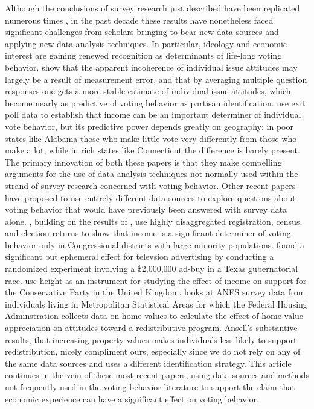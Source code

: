Although the conclusions of survey research just described have been replicated numerous times \parencite{Nie1976,Smith989,LewisBeck2008}, in the past decade these results have nonetheless faced significant challenges from scholars bringing to bear new data sources and applying new data analysis techniques. In particular, ideology and economic interest are gaining renewed recognition as determinants of life-long voting behavior. \textcite{Ansolabehere2008} show that the apparent incoherence of individual issue attitudes may largely be a result of measurement error, and that by averaging multiple question responses one gets a more stable estimate of individual issue attitudes, which become nearly as predictive of voting behavior as partisan identification.  \textcite{Gelman2007} use exit poll data to establish that income can be an important determiner of individual vote behavior, but its predictive power depends greatly on geography: in poor states like Alabama those who make little vote very differently from those who make a lot, while in rich states like Connecticut the difference is barely present. The primary innovation of both these papers is that they make compelling arguments for the use of data analysis techniques not normally used within the strand of survey research concerned with voting behavior.  Other recent papers have proposed to use entirely different data sources to explore questions about voting behavior that would have previously been answered with survey data alone. \textcite{Hersh2015}, building on the results of \textcite{Gelman2007}, use highly disaggregated registration, census, and election returns to show that income is a significant determiner of voting behavior only in Congressional districts with large minority populations. \textcite{Gerber2011} found a significant but ephemeral effect for televsion advertising by conducting a randomized experiment involving a \$2,000,000 ad-buy in a Texas gubernatorial race. \citeauthor{Arunchalam} use height as an instrument for studying the effect of income on support for the Conservative Party in the United Kingdom. \textcite{Ansell2014} looks at ANES survey data from individuals living in Metropolitan Statistical Areas for which the Federal Housing Adminstration collects data on home values to calculate the effect of home value appreciation on attitudes toward a redistributive program. Ansell's substantive results, that increasing property values makes individuals less likely to support redistribution, nicely compliment ours, especially since we do not rely on any of the same data sources and uses a different identification strategy.  This article continues in the vein of these most recent papers, using data sources and methods not frequently used in the voting behavior literature to support the claim that economic experience can have a significant effect on voting behavior. 



